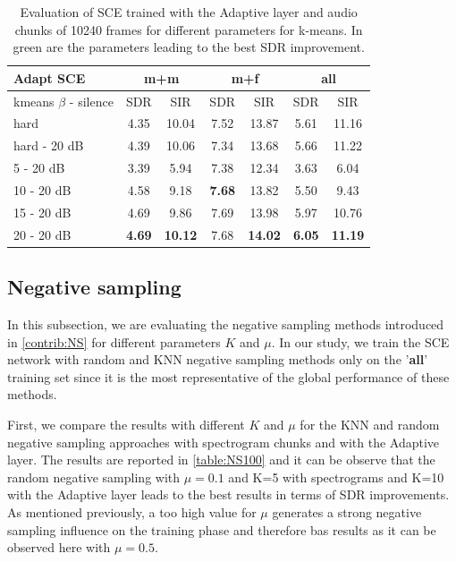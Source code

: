 \documentclass[master, tikz, final,11pt, dvipdfmx]{iscs-thesis}
\begin{document}
\begin{table}[h]
\centering
\begin{tabular}{l|c|c|c|c|c|c}
Adapt SCE & \multicolumn{2}{c|}{m+m} & \multicolumn{2}{c|}{m+f} & \multicolumn{2}{c}{all} \\ 
\hline 
kmeans $\beta$ - silence & SDR & SIR & SDR & SIR & SDR & SIR \\ 
\hline
hard   & 4.35 & 10.04 & 7.52 & 13.87 & 5.61 & 11.16 \\ 
hard - 20 dB  & 4.39 & 10.06 & 7.34 & 13.68 & 5.66 & 11.22 \\
\hline
\hline
5 - 20 dB  & 3.39 & 5.94 & 7.38 & 12.34 & 3.63 & 6.04 \\ 
10 - 20 dB  & 4.58 & 9.18 & \cellcolor{green}\textbf{7.68} & \cellcolor{green}13.82 & 5.50 & 9.43 \\ 
15 - 20 dB & 4.69 & 9.86 & 7.69 & 13.98 & 5.97 & 10.76 \\ 
20 - 20 dB & \cellcolor{green}\textbf{4.69} & \cellcolor{green}\textbf{10.12} & 7.68 & \textbf{14.02} & \cellcolor{green}\textbf{6.05} & \cellcolor{green}\textbf{11.19} \\ 
\end{tabular}
\caption[Evaluation of SCE trained with the Adaptive layer and audio chunks of 10240 frames for different parameters for k-means]{Evaluation of SCE trained with the Adaptive layer and audio chunks of 10240 frames for different parameters for k-means. In green are the parameters leading to the best SDR improvement.}
\label{table:AdaptSCE100softkmeans}
\end{table}

\subsection{Negative sampling}
\label{NS}

In this subsection, we are evaluating the negative sampling methods introduced in \autoref{contrib:NS} for different parameters $K$ and $\mu$. In our study, we train the SCE network with random and KNN negative sampling methods only on the '\textbf{all}' training set since it is the most representative of the global performance of these methods.

First, we compare the results with different $K$ and $\mu$ for the KNN and random negative sampling approaches with spectrogram chunks and with the Adaptive layer. The results are reported in \autoref{table:NS100} and it can be observe that the random negative sampling with $\mu=0.1$ and K=5 with spectrograms and K=10 with the Adaptive layer leads to the best results in terms of SDR improvements. As mentioned previously, a too high value for $\mu$ generates a strong negative sampling influence on the training phase and therefore bas results as it can be observed here with $\mu =0.5$. 
\end{document}
